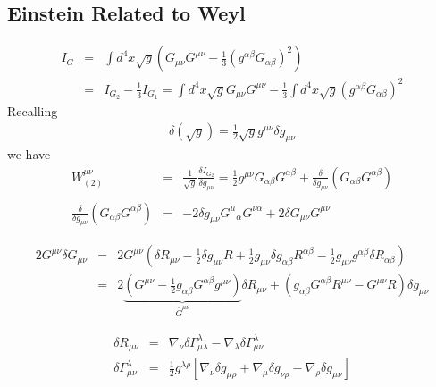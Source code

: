 \documentclass[10pt,letterpaper]{article}
\numberwithin{equation}{section}
\begin{document}
\begin{appendices}
\section{Einstein Related to Weyl}
\begin{eqnarray}
I_G &=& \int d^4x \sqrt g \left( G_{\mu\nu}G^{\mu\nu} -\tfrac13 (g^{\alpha\beta}G_{\alpha\beta})^2 \right)
\nonumber\\
&=& I_{G_2} - \frac13 I_{G_1}= \int d^4x \sqrt{g}  G_{\mu\nu}G^{\mu\nu} - \frac13 \int d^4x \sqrt{g} (g^{\alpha\beta} G_{\alpha\beta})^2
\end{eqnarray}
Recalling
\begin{eqnarray}
\delta(\sqrt g) = \frac12 \sqrt g g^{\mu\nu} \delta g_{\mu\nu} 
\end{eqnarray}
we have
\begin{eqnarray}
W_{(2)}^{\mu\nu} &=& \frac{1}{\sqrt g} \frac{\delta I_{G_2}}{\delta g_{\mu\nu} } = \frac12 g^{\mu\nu} G_{\alpha\beta}G^{\alpha\beta} +\frac{\delta}{\delta g_{\mu\nu}}\left(G_{\alpha\beta}G^{\alpha\beta}\right)
\nonumber\\ \nonumber\\
\frac{\delta}{\delta g_{\mu\nu}}\left(G_{\alpha\beta}G^{\alpha\beta}\right)&=&
-2\delta g_{\mu\nu} G^\mu{}_\alpha G^{\nu\alpha} + 2 \delta G_{\mu\nu} G^{\mu\nu}
\end{eqnarray}

\begin{eqnarray}
2G^{\mu\nu}\delta G_{\mu\nu} &=& 2G^{\mu\nu}(\delta R_{\mu\nu} -\tfrac12 \delta g_{\mu\nu} R + \tfrac12 g_{\mu\nu}\delta g_{\alpha\beta}R^{\alpha\beta} -\tfrac12 g_{\mu\nu}  g^{\alpha\beta}\delta R_{\alpha\beta})
\nonumber\\
&=&2\underbrace{(G^{\mu\nu} -\tfrac12 g_{\alpha\beta}G^{\alpha\beta} g^{\mu\nu})}_{\bar G^{\mu\nu}}\delta R_{\mu\nu} +( 
 g_{\alpha\beta}G^{\alpha\beta}R^{\mu\nu}-G^{\mu\nu} R) \delta g_{\mu\nu}
\end{eqnarray}

\begin{eqnarray}
\delta R_{\mu\nu} &=& \nabla_\nu \delta \Gamma^\lambda_{\mu\lambda} - \nabla_\lambda \delta \Gamma^\lambda_{\mu\nu} 
\nonumber\\
\delta \Gamma^\lambda_{\mu\nu}&=& \tfrac12 g^{\lambda\rho}[\nabla_\nu \delta g_{\mu\rho} + \nabla_\mu \delta g_{\nu\rho} - \nabla_\rho \delta g_{\mu\nu}]
\end{eqnarray}


\end{appendices}
\end{document}
